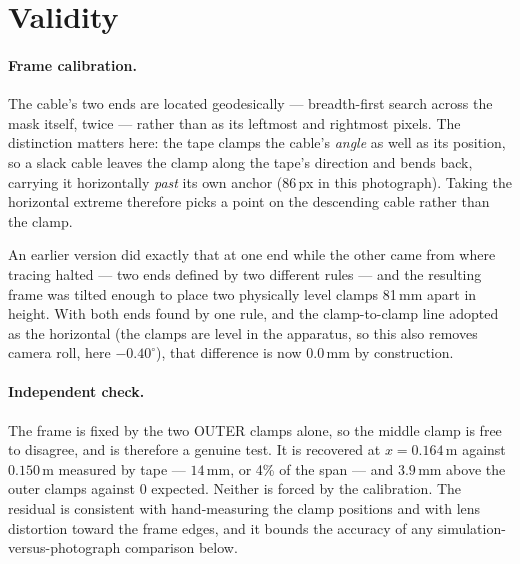 \documentclass[11pt,a4paper]{article}
\begin{document}
\section{Validity}
\label{sec:validity}

\paragraph{Frame calibration.} The cable's two ends are located
geodesically --- breadth-first search across the mask itself, twice --- rather
than as its leftmost and rightmost pixels. The distinction matters here: the
tape clamps the cable's \emph{angle} as well as its position, so a slack
cable leaves the clamp along the tape's direction and bends back, carrying it
horizontally \emph{past} its own anchor (86\,px in this photograph). Taking
the horizontal extreme therefore picks a point on the descending cable rather
than the clamp.

An earlier version did exactly that at one end while the other came from where
tracing halted --- two ends defined by two different rules --- and the
resulting frame was tilted enough to place two physically level clamps 81\,mm
apart in height. With both ends found by one rule, and the clamp-to-clamp line
adopted as the horizontal (the clamps are level in the apparatus, so this also
removes camera roll, here $-0.40^\circ$), that difference is now $0.0$\,mm by
construction.

\paragraph{Independent check.} The frame is fixed by the two OUTER clamps
alone, so the middle clamp is free to disagree, and is therefore a genuine
test. It is recovered at $x = 0.164$\,m against $0.150$\,m measured by tape ---
$14$\,mm, or 4\% of the span --- and $3.9$\,mm above the outer clamps against
$0$ expected. Neither is forced by the calibration. The residual is consistent
with hand-measuring the clamp positions and with lens distortion toward the
frame edges, and it bounds the accuracy of any
simulation-versus-photograph comparison below.
\end{document}
